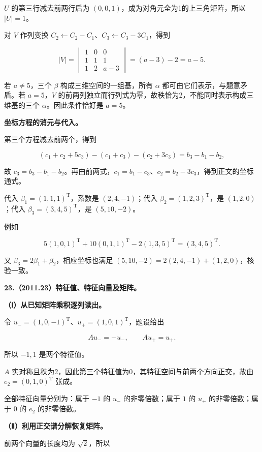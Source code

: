 \documentclass[UTF8,11pt,fontset=windows]{ctexart}
\begin{document}
$U$ 的第三行减去前两行后为 $(0,0,1)$，成为对角元全为1的上三角矩阵，所以 $|U|=1$。

对 $V$ 作列变换 $C_2\leftarrow C_2-C_1$、$C_3\leftarrow C_3-3C_1$，得到

$$
|V|=\begin{vmatrix}1&0&0\\1&1&1\\1&2&a-3\end{vmatrix}
=(a-3)-2=a-5.
$$

若 $a\ne5$，三个 $\beta$ 构成三维空间的一组基，所有 $\alpha$ 都可由它们表示，与题意矛盾。若 $a=5$，$V$ 的前两列独立而行列式为零，故秩恰为2，不能同时表示构成三维基的三个 $\alpha$。因此条件恰好是 $a=5$。

\textbf{坐标方程的消元与代入。}

第三个方程减去前两个，得到

$$
(c_1+c_2+5c_3)-(c_1+c_3)-(c_2+3c_3)
=b_3-b_1-b_2,
$$

故 $c_3=b_3-b_1-b_2$。再由前两式，$c_1=b_1-c_3$、$c_2=b_2-3c_3$，得到正文的坐标通式。

代入 $\beta_1=(1,1,1)^{\mathrm T}$，系数是 $(2,4,-1)$；代入 $\beta_2=(1,2,3)^{\mathrm T}$，是 $(1,2,0)$；代入 $\beta_3=(3,4,5)^{\mathrm T}$，是 $(5,10,-2)$。

例如

$$
5(1,0,1)^{\mathrm T}+10(0,1,1)^{\mathrm T}-2(1,3,5)^{\mathrm T}
=(3,4,5)^{\mathrm T}.
$$

又 $\beta_3=2\beta_1+\beta_2$，相应坐标也满足 $(5,10,-2)=2(2,4,-1)+(1,2,0)$，核验一致。

\clearpage

\textbf{23.（2011.23）特征值、特征向量及矩阵。}

\textbf{（Ⅰ）从已知矩阵乘积逐列读出。}

令 $u_-=(1,0,-1)^{\mathrm T}$、$u_+=(1,0,1)^{\mathrm T}$，题设给出

$$
Au_-=-u_-,\qquad Au_+=u_+.
$$

所以 $-1,1$ 是两个特征值。

$A$ 实对称且秩为2，因此第三个特征值为0，其特征空间与前两个方向正交，故由 $e_2=(0,1,0)^{\mathrm T}$ 张成。

全部特征向量分别为：属于 $-1$ 的 $u_-$ 的非零倍数；属于 $1$ 的 $u_+$ 的非零倍数；属于 $0$ 的 $e_2$ 的非零倍数。

\textbf{（Ⅱ）利用正交谱分解恢复矩阵。}

前两个向量的长度均为 $\sqrt2$，所以
\end{document}
